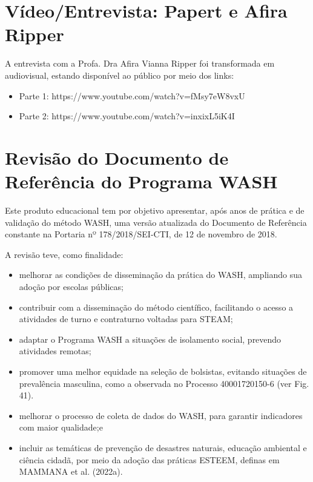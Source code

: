\section[Vídeo/Entrevista: Papert e Afira Ripper]{Vídeo/Entrevista: Papert e Afira Ripper}\label{Vídeo/Entrevista: Papert e Afira Ripper}
A entrevista com a Profa. Dra Afira Vianna Ripper foi transformada em audiovisual, estando disponível ao público por meio dos links:


\begin{itemize}
\item Parte 1: https://www.youtube.com/watch?v=fMsy7eW8vxU
\item Parte 2: https://www.youtube.com/watch?v=inxixL5iK4I
\end{itemize}

\section[Revisão do Documento de Referência do Programa WASH]{Revisão do Documento de Referência do Programa WASH}\label{Revisão do Documento de Referência do Programa WASH}
Este produto educacional tem por objetivo apresentar, após anos de prática e de validação do método WASH, uma versão atualizada do Documento de Referência constante na Portaria nº 178/2018/SEI-CTI, de 12 de novembro de 2018.

A revisão teve, como finalidade:


\begin{itemize}
\item melhorar as condições de disseminação da prática do WASH, ampliando sua adoção por escolas públicas;
\item contribuir com a disseminação do método científico, facilitando o acesso a atividades de turno e contraturno voltadas para STEAM;
\item adaptar o Programa WASH a situações de isolamento social, prevendo atividades remotas;
\item promover uma melhor equidade na seleção de bolsistas, evitando situações de prevalência masculina, como a observada no Processo 40001720150-6 (ver Fig. 41).
\item melhorar o processo de coleta de dados do WASH, para garantir indicadores com maior qualidade;e
\item incluir as temáticas de prevenção de desastres naturais, educação ambiental e ciência cidadã, por meio da adoção das práticas ESTEEM, definas em  MAMMANA et al. (2022a).
\end{itemize}

